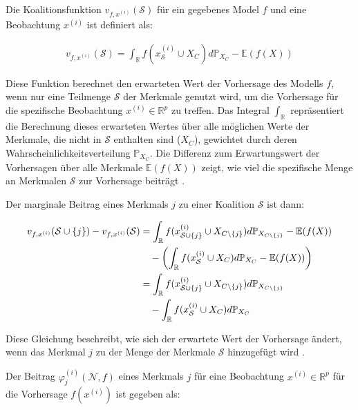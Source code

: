 Die Koalitionsfunktion $v_{f, x^{(i)}}(\mathcal{S})$ für ein gegebenes Model $f$ und eine Beobachtung $x^{(i)}$ ist definiert als:

\begin{align}
    \label{eq:shap-value-func}
    v_{f, x^{(i)}}(\mathcal{S}) = \int_{\mathbb{R}} f(x^{(i)}_{\mathcal{S}} \cup X_{C}) d\mathbb{P}_{X_{C}} - \mathbb{E}(f(X))
\end{align}

Diese Funktion berechnet den erwarteten Wert der Vorhersage des Modells $f$, wenn nur eine Teilmenge $\mathcal{S}$ der 
Merkmale genutzt wird, um die Vorhersage für die spezifische Beobachtung $x^{(i)} \in \mathbb{R}^{p}$ zu treffen. 
Das Integral $\int_{\mathbb{R}}$ repräsentiert die Berechnung dieses erwarteten Wertes über alle möglichen Werte der Merkmale, 
die nicht in $\mathcal{S}$ enthalten sind ($X_C$), gewichtet durch deren Wahrscheinlichkeitsverteilung $\mathbb{P}_{X_{C}}$. 
Die Differenz zum Erwartungswert der Vorhersagen über alle Merkmale $\mathbb{E}(f(X))$ zeigt, 
wie viel die spezifische Menge an Merkmalen $\mathcal{S}$ zur Vorhersage beiträgt \cite[S. 221, S. 27]{Molnar_2022, Molnar_2023}.

Der marginale Beitrag eines Merkmals $j$ zu einer Koalition $\mathcal{S}$ ist dann:

\begin{align}
    \label{eq:shap-marginal-func}
    v_{f, x^{(i)}}(\mathcal{S} \cup \{j\}) - v_{f, x^{(i)}}(\mathcal{S}) &= \int_{\mathbb{R}} f(x^{(i)}_{\mathcal{S} \cup \{j\}} \cup X_{C \setminus \{j\}}) d\mathbb{P}_{X_{C \setminus \{j\}}} - \mathbb{E}(f(X)) \\ \notag
    &\quad - \left( \int_{\mathbb{R}} f(x^{(i)}_{\mathcal{S}} \cup X_{C}) d\mathbb{P}_{X_{C}} - \mathbb{E}(f(X)) \right) \\ \notag
    &= \int_{\mathbb{R}} f(x^{(i)}_{\mathcal{S} \cup \{j\}} \cup X_{C \setminus \{j\}}) d\mathbb{P}_{X_{C \setminus \{j\}}} \\ \notag
    &\quad - \int_{\mathbb{R}} f(x^{(i)}_{\mathcal{S}} \cup X_{C}) d\mathbb{P}_{X_{C}}
\end{align}

Diese Gleichung beschreibt, wie sich der erwartete Wert der Vorhersage ändert, wenn das Merkmal $j$ zu der Menge der Merkmale $\mathcal{S}$ hinzugefügt wird \cite[S. 29]{Molnar_2023}.

Der Beitrag $\varphi_j^{(i)}(\mathcal{N}, f)$ eines Merkmals $j$ für eine Beobachtung $x^{(i)} \in \mathbb{R}^{p}$ für die Vorhersage $f(x^{(i)})$ ist gegeben als:

